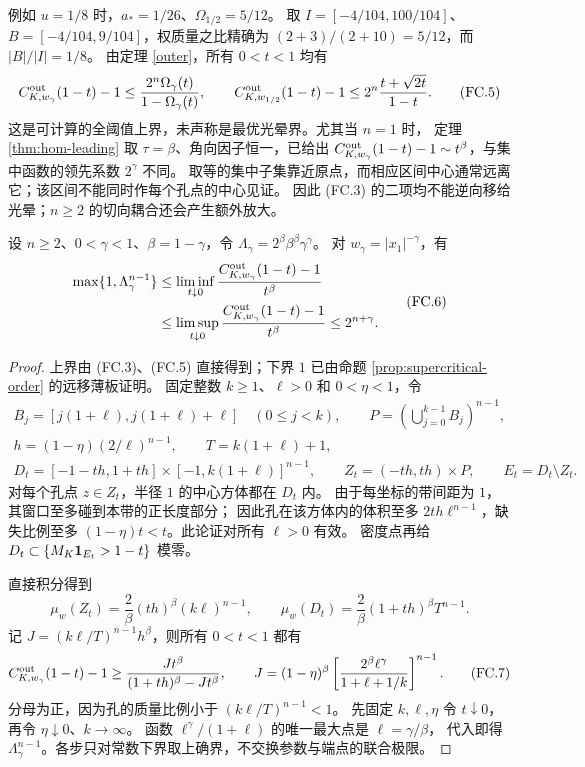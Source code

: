 例如 $u=1/8$ 时，$a_*=1/26$、$\Omega_{1/2}=5/12$。
取 $I=[-4/104,100/104]$、$B=[-4/104,9/104]$，权质量之比精确为
$(2+3)/(2+10)=5/12$，而 $|B|/|I|=1/8$。
由定理 \ref{outer}，所有 $0<t<1$ 均有
\[
 C^{\rm out}_{K,w_\gamma}(1-t)-1\le
 \frac{2^n\Omega_\gamma(t)}{1-\Omega_\gamma(t)},\qquad
 C^{\rm out}_{K,w_{1/2}}(1-t)-1\le2^n\frac{t+\sqrt{2t}}{1-t}.\tag{FC.5}
\]
这是可计算的全阈值上界，未声称是最优光晕界。尤其当 $n=1$ 时，
定理 \ref{thm:hom-leading} 取 $\tau=\beta$、角向因子恒一，已给出
$C^{\rm out}_{K,w_\gamma}(1-t)-1\sim t^\beta$，与集中函数的领先系数 $2^\gamma$ 不同。
取等的集中子集靠近原点，而相应区间中心通常远离它；该区间不能同时作每个孔点的中心见证。
因此 (FC.3) 的二项均不能逆向移给光晕；$n\ge2$ 的切向耦合还会产生额外放大。

\begin{proposition}[切向网格的光晕下界]\label{prop:flat-grid-lower}
设 $n\ge2$、$0<\gamma<1$、$\beta=1-\gamma$，令
$\Lambda_\gamma=2^\beta\beta^\beta\gamma^\gamma$。
对 $w_\gamma=|x_1|^{-\gamma}$，有
\[
 \begin{aligned}
 \max\{1,\Lambda_\gamma^{n-1}\}
 &\le\liminf_{t\downarrow0}\frac{C^{\rm out}_{K,w_\gamma}(1-t)-1}{t^\beta}\\
 &\le\limsup_{t\downarrow0}\frac{C^{\rm out}_{K,w_\gamma}(1-t)-1}{t^\beta}
 \le2^{n+\gamma}.
 \end{aligned}\tag{FC.6}
\]
\end{proposition}
\begin{proof}
上界由 (FC.3)、(FC.5) 直接得到；下界 $1$ 已由命题
\ref{prop:supercritical-order} 的远移薄板证明。
固定整数 $k\ge1$、$\ell>0$ 和 $0<\eta<1$，令
\[
 \begin{gathered}
 B_j=[j(1+\ell),j(1+\ell)+\ell]\quad(0\le j<k),\qquad
 P=\left(\bigcup_{j=0}^{k-1}B_j\right)^{n-1},\\
 h=(1-\eta)(2/\ell)^{n-1},\qquad T=k(1+\ell)+1,\\
 D_t=[-1-th,1+th]\times[-1,k(1+\ell)]^{n-1},\qquad
 Z_t=(-th,th)\times P,\qquad E_t=D_t\setminus Z_t.
 \end{gathered}
\]
对每个孔点 $z\in Z_t$，半径 $1$ 的中心方体都在 $D_t$ 内。
由于每坐标的带间距为 $1$，其窗口至多碰到本带的正长度部分；
因此孔在该方体内的体积至多 $2th\ell^{n-1}$，缺失比例至多
$(1-\eta)t<t$。此论证对所有 $\ell>0$ 有效。
密度点再给 $D_t\subset\{M_K\mathbf 1_{E_t}>1-t\}$ 模零。

直接积分得到
\[
 \mu_w(Z_t)=\frac2\beta(th)^\beta(k\ell)^{n-1},\qquad
 \mu_w(D_t)=\frac2\beta(1+th)^\beta T^{n-1}.
\]
记 $J=(k\ell/T)^{n-1}h^\beta$，则所有 $0<t<1$ 都有
\[
 C^{\rm out}_{K,w_\gamma}(1-t)-1
 \ge\frac{Jt^\beta}{(1+th)^\beta-Jt^\beta},\qquad
 J=(1-\eta)^\beta
 \left[\frac{2^\beta\ell^\gamma}{1+\ell+1/k}\right]^{n-1}.\tag{FC.7}
\]
分母为正，因为孔的质量比例小于 $(k\ell/T)^{n-1}<1$。
先固定 $k,\ell,\eta$ 令 $t\downarrow0$，再令 $\eta\downarrow0$、$k\to\infty$。
函数 $\ell^\gamma/(1+\ell)$ 的唯一最大点是 $\ell=\gamma/\beta$，
代入即得 $\Lambda_\gamma^{n-1}$。各步只对常数下界取上确界，不交换参数与端点的联合极限。
\end{proof}

